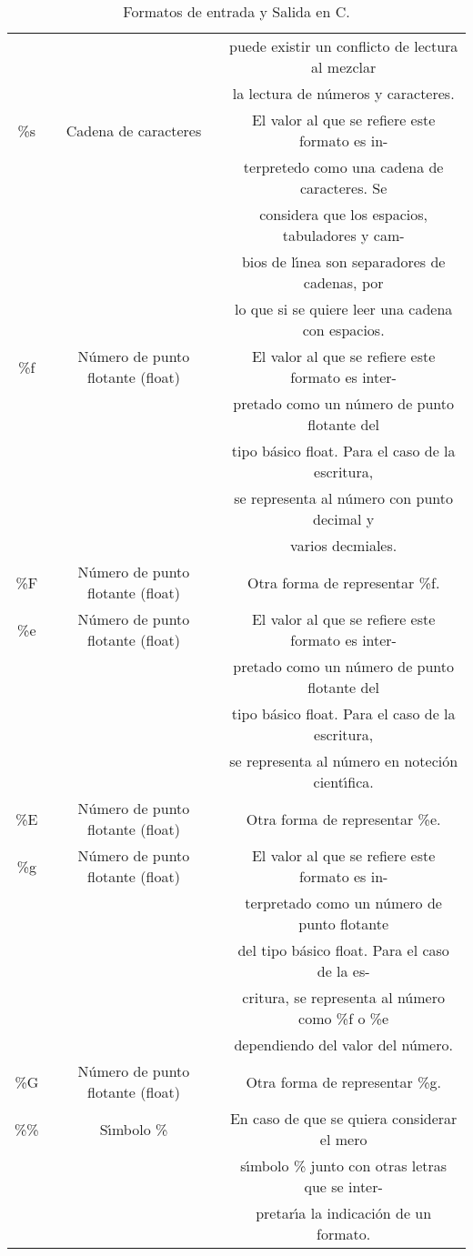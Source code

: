 \begin{table}[H]
\begin{tabular}{ c | c | c }
    & & puede existir un conflicto de lectura al mezclar\\ 
    & & la lectura de números y caracteres.\\ \hline
\%s & Cadena de caracteres & El valor al que se refiere este formato es in- \\
    & & terpretedo como una cadena de caracteres. Se \\
    & & considera que los espacios, tabuladores y cam- \\ 
    & & bios de lı́nea son separadores de cadenas, por \\
    & & lo que si se quiere leer una cadena con espacios. \\ \hline
\%f & Número de punto flotante (float) & El valor al que se refiere este formato es inter- \\
    & & pretado como un número de punto flotante del \\ 
    & & tipo básico float. Para el caso de la escritura, \\ 
    & & se representa al número con punto decimal y \\
    & & varios decmiales. \\ \hline
\%F & Número de punto flotante (float) & Otra forma de representar \%f. \\ \hline
\%e & Número de punto flotante (float) & El valor al que se refiere este formato es inter- \\ 
    & & pretado como un número de punto flotante del \\ 
    & & tipo básico float. Para el caso de la escritura, \\ 
    & & se representa al número en noteción cientı́fica. \\ \hline
\%E & Número de punto flotante (float) & Otra forma de representar \%e. \\ \hline
\%g & Número de punto flotante (float) & El valor al que se refiere este formato es in- \\
    & & terpretado como un número de punto flotante \\
    & & del tipo básico float. Para el caso de la es- \\ 
    & & critura, se representa al número como \%f o \%e \\ 
    & & dependiendo del valor del número. \\ \hline
\%G & Número de punto flotante (float) & Otra forma de representar \%g. \\ \hline
\%\% & Sı́mbolo \% & En caso de que se quiera considerar el mero \\ 
    & & sı́mbolo \% junto con otras letras que se inter- \\ 
    & & pretarı́a la indicación de un formato. \\ \hline
\end{tabular}
\\
\caption{Formatos de entrada y Salida en C.}
\end{table}
\pagebreak 

